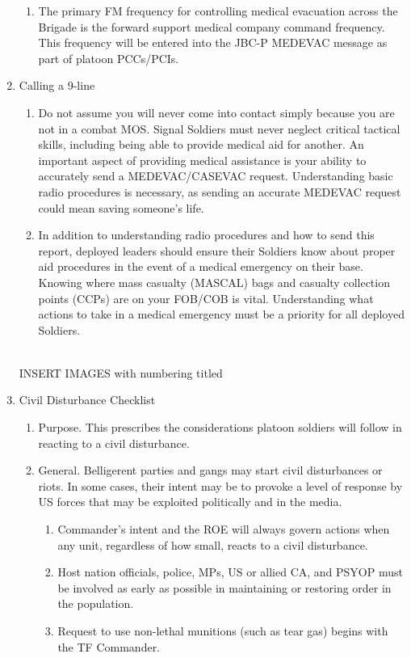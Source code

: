 \documentclass{article}
\begin{document}
\begin{enumerate}
\begin{enumerate}
\item	The primary FM frequency for controlling medical evacuation across the Brigade is the forward support medical company command frequency.  This frequency will be entered into the JBC-P MEDEVAC message as part of platoon PCCs/PCIs.  
 \end{enumerate}
\item	Calling a 9-line
\begin{enumerate}
    \item Do not assume you will never come into contact simply because you are not in a combat MOS. Signal Soldiers must never neglect critical tactical skills, including being able to provide medical aid for another. An important aspect of providing medical assistance is your ability to accurately send a MEDEVAC/CASEVAC request. Understanding basic radio procedures is necessary, as sending an accurate MEDEVAC request could mean saving someone’s life. 
\item In addition to understanding radio procedures and how to send this report, deployed leaders should ensure their Soldiers know about proper aid procedures in the event of a medical emergency on their base. Knowing where mass casualty (MASCAL) bags and casualty collection points (CCPs) are on your FOB/COB is vital. Understanding what actions to take in a medical emergency must be a priority for all deployed Soldiers.
\end{enumerate}
\\
INSERT IMAGES with numbering titled
\\
\item	Civil Disturbance Checklist
\begin{enumerate}
    \item Purpose. This prescribes the considerations platoon soldiers will follow in reacting to a civil disturbance.
\item	General. Belligerent parties and gangs may start civil disturbances or riots.  In some cases, their intent may be to provoke a level of response by US forces that may be exploited politically and in the media.
\begin{enumerate}
    \item 	Commander’s intent and the ROE will always govern actions when any unit, regardless of how small, reacts to a civil disturbance.
\item	Host nation officials, police, MPs, US or allied CA, and PSYOP must be involved as early as possible in maintaining or restoring order in the population.
\item	Request to use non-lethal munitions (such as tear gas) begins with the TF Commander.

\end{enumerate}
\end{enumerate}
\end{enumerate}
\end{document}
